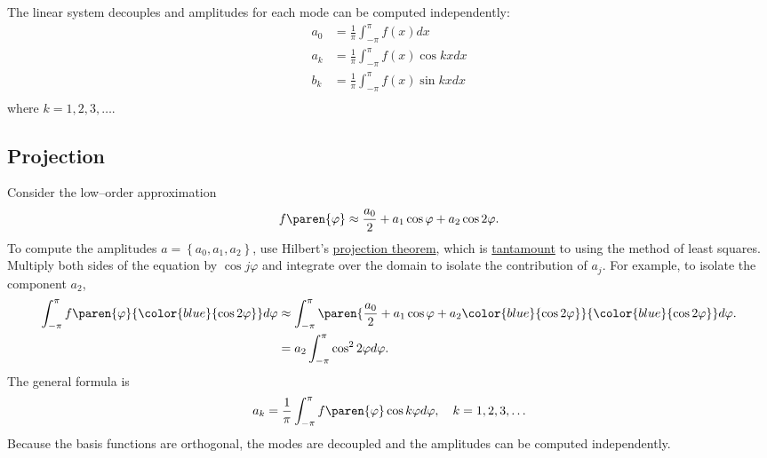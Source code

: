 The linear system decouples and amplitudes for each mode can be computed independently:
\begin{equation}
	\begin{split}
		a_{0} &= \tfrac{1}{\pi} \int_{-\pi}^{\pi} f(x) dx \\
		a_{k} &= \tfrac{1}{\pi} \int_{-\pi}^{\pi} f(x) \cos kx dx \\
		b_{k} &= \tfrac{1}{\pi} \int_{-\pi}^{\pi} f(x) \sin kx dx \\
	\end{split}
\end{equation}
where $k=1,2,3,\dots$.

\subsection{Projection}
Consider the low--order approximation 
%
\begin{equation}
	f\paren{\varphi}  \approx \frac{a_{0}}{2}  + a_{1} \cos \varphi +  a_{2} \cos 2\varphi.
\label{eq:model}
\end{equation}
%
To compute the amplitudes $a=\left\{a_{0}, a_{1}, a_{2} \right\}$, use Hilbert's \href{https://en.wikipedia.org/wiki/Hilbert_projection_theorem}{projection theorem}, which is \href{http://www.kris-nimark.net/pdf/ProjectionTheorem.pdf}{tantamount} to using the method of least squares. Multiply both sides of the equation by $\cos j \varphi$ and integrate over the domain to isolate the contribution of $a_{j}$. For example, to isolate the component $a_{2}$,
%
\begin{equation}
	\begin{split}
		\int_{-\pi}^{\pi}{ f\paren{\varphi}  {\color{blue}{\cos 2\varphi }}} d\varphi  
			&\approx \int_{-\pi}^{\pi}{ \paren{\frac{a_{0}}{2}  + a_{1} \cos \varphi +  a_{2} {\color{blue}{\cos 2\varphi}} } {\color{blue}{\cos 2\varphi}}} d\varphi. \\
			&= a_{2} \int_{-\pi}^{\pi}{ \cos^{2} 2\varphi } d\varphi. \\
	\end{split}
\end{equation}
%
The general formula is
\begin{equation}
	a_{k} = \frac{1}{\pi} \int_{-\pi}^{\pi} f\paren{\varphi} \cos k\varphi d\varphi, \quad k=1,2,3,\dots
\label{eq:linear system}
\end{equation}
Because the basis functions are orthogonal, the modes are decoupled and the amplitudes can be computed independently.

